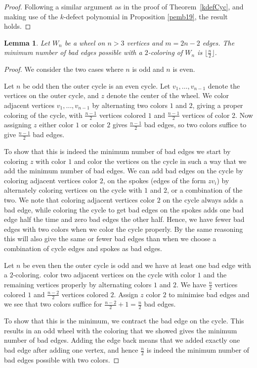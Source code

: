 \documentclass[12pt]{amsart}
\newtheorem{lemma}[theorem]{Lemma}
\theoremstyle{definition}
\theoremstyle{remark}
\numberwithin{equation}{section}
\begin{document}
\begin{proof}
    Following a similar argument as in the proof of Theorem~\ref{kdefCyc}, and making use of the $k$-defect polynomial  in Proposition \ref{pemb19}, the result holds.
\end{proof}

\begin{lemma}\label{lem:wheelmindefectscol2}
Let $W_n$ be a wheel on $n>3$ vertices and $m=2n-2$ edges. The minimum number of bad edges possible with a $2$-coloring of $W_n$ is $\lfloor \frac{n}{2}\rfloor$.
\end{lemma}

\begin{proof}
    We consider the two cases where $n$ is odd and $n$ is even.

    Let $n$ be odd then the outer cycle is an even cycle. Let $v_1, \dots, v_{n-1}$ denote the vertices on the outer cycle, and $z$ denote the center of the wheel. We color adjacent vertices $v_1, \dots, v_{n-1}$ by alternating two colors $1$ and $2$, giving a proper coloring of the cycle, with $\frac{n-1}{2}$ vertices colored $1$ and $\frac{n-1}{2}$ vertices of color 2. Now assigning $z$ either color $1$ or color $2$ gives $\frac{n-1}{2}$ bad edges, so two colors suffice to give $\frac{n-1}{2}$ bad edges.

    To show that this is indeed the minimum number of bad edges we start by coloring $z$ with color $1$ and color the vertices on the cycle in such a way that we add the minimum number of bad edges. We can add bad edges on the cycle by coloring adjacent vertices color $2$, on the spokes (edges of the form $zv_i$) by alternately coloring vertices on the cycle with $1$ and $2$, or a combination of the two. We note that coloring adjacent vertices color $2$ on the cycle always adds a bad edge, while coloring the cycle to get bad edges on the spokes adds one bad edge half the time and zero bad edges the other half. Hence, we have fewer bad edges with two colors when we color the cycle properly. By the same reasoning this will also give the same or fewer bad edges than when we choose a combination of cycle edges and spokes as bad edges.

Let $n$ be even then the outer cycle is odd and we have at least one bad edge with a $2$-coloring. color two adjacent vertices on the cycle with color $1$ and the remaining vertices properly by alternating colors $1$ and $2$. We have $\frac{n}{2}$ vertices colored $1$ and $\frac{n-2}{2}$ vertices colored $2$. Assign $z$ color $2$ to minimise bad edges and we see that two colors suffice for $\frac{n-2}{2}+1=\frac{n}{2}$ bad edges.

To show that this is the minimum, we contract the bad edge on the cycle. This results in an odd wheel with the coloring that we showed gives the minimum number of bad edges. Adding the edge back means that we added exactly one bad edge after adding one vertex, and hence $\frac{n}{2}$ is indeed the minimum number of bad edges possible with two colors.
\end{proof}
\end{document}
